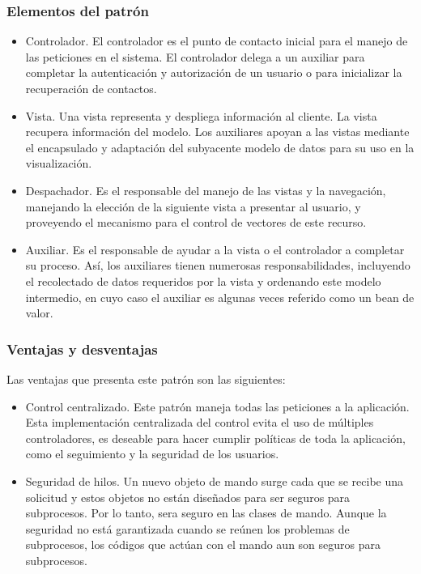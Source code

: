 \documentclass[a4paper,12pt]{article}
\begin{document}
\subsubsection{Elementos del patrón}
\begin{itemize}
 \item Controlador. El controlador es el punto de contacto inicial para el 
manejo de las peticiones en el sistema. El controlador delega a un auxiliar 
para completar la autenticación y autorización de un usuario o para inicializar 
la recuperación de contactos.
\item Vista. Una vista representa y despliega información al cliente. La 
vista recupera información del modelo. Los auxiliares apoyan a las vistas 
mediante el encapsulado y adaptación del subyacente modelo de datos para su uso 
en la visualización.
\item Despachador. Es el responsable del manejo de las vistas y la 
navegación, manejando la elección de la siguiente vista a presentar al usuario, 
y proveyendo el mecanismo para el control de vectores de este recurso.
\item Auxiliar. Es el responsable de ayudar a la vista o el controlador a 
completar su proceso. Así, los auxiliares tienen numerosas responsabilidades, 
incluyendo el recolectado de datos requeridos por la vista y ordenando este 
modelo intermedio, en cuyo caso el auxiliar es algunas veces referido como un 
bean de valor. 
\end{itemize}

\subsubsection{Ventajas y desventajas}
Las ventajas que presenta este patrón son las siguientes:
\begin{itemize}
 \item Control centralizado. Este patrón maneja todas las peticiones a la 
aplicación. Esta implementación centralizada del control evita el uso de 
múltiples controladores, es deseable para hacer cumplir políticas de toda la 
aplicación, como el seguimiento y la seguridad de los usuarios.
\item Seguridad de hilos. Un nuevo objeto de mando surge cada que se recibe 
una solicitud y estos objetos no están diseñados para ser seguros para 
subprocesos. Por lo tanto, sera seguro en las clases de mando. Aunque la 
seguridad no está garantizada cuando se reúnen los problemas de subprocesos, 
los códigos que actúan con el mando aun son seguros para subprocesos.
\end{itemize}
\end{document}
